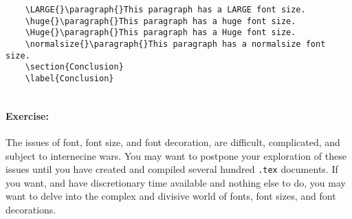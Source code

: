 \begin{verbatim}
    \LARGE{}\paragraph{}This paragraph has a LARGE font size.
    \huge{}\paragraph{}This paragraph has a huge font size.
    \Huge{}\paragraph{}This paragraph has a Huge font size.
    \normalsize{}\paragraph{}This paragraph has a normalsize font size.
    \section{Conclusion}
    \label{Conclusion}
    
        \end{verbatim}

        \paragraph{Exercise:} The issues of font, font size, and font decoration, are difficult, complicated, and subject to internecine wars. You may want to postpone your exploration of these issues until you have created and compiled several hundred \texttt{.tex} documents. If you want, and have discretionary time available and nothing else to do, you may want to delve into the complex and divisive world of fonts, font sizes, and font decorations.

